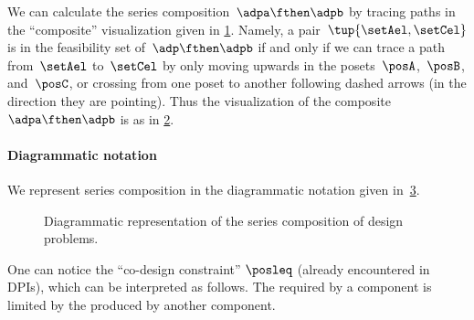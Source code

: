 We can calculate the series composition~$\adpa \fthen \adpb$ by tracing paths in the ``composite'' visualization given in \cref{fig:example_dp_graph_xyz}.
Namely, a pair~$\tup{\setAel, \setCel}$ is in the feasibility set of~$\adp \fthen \adpb$ if and only if we can trace a path from~$\setAel$ to~$\setCel$ by only moving upwards in the posets~$\posA$,~$\posB$, and~$\posC$, or crossing from one poset to another following dashed arrows (in the direction they are pointing).
Thus the visualization of the composite~$\adpa \fthen \adpb$ is as in \cref{fig:example_dp_graph_xz}.
\begin{figure}[h!]
    \centering
    \caption{}
    \label{fig:example_dp_graph_xyz}
\end{figure}
\begin{figure}[h!]
    \centering
    \caption{}
    \label{fig:example_dp_graph_xz}
\end{figure}


\paragraph{Diagrammatic notation}
We represent series composition in the diagrammatic notation given in~\cref{fig:compositiondiagram}.

\begin{figure}[h!]
    \centering
    \caption{Diagrammatic representation of the series composition of design problems. }
    \label{fig:compositiondiagram}
\end{figure}

One can notice the ``co-design constraint'' $\posleq$ (already encountered in DPIs), which can be interpreted as follows.
The  required by a component is limited by the  produced by another component.

